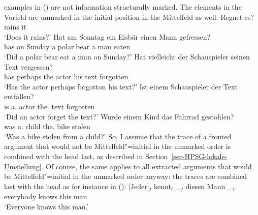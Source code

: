 examples in () are not information structurally marked. The elements in the Vorfeld are
unmarked in the initial position in the Mittelfeld as well:
\eal
\ex
\gll Regnet es?\\
     rains it\\
\glt `Does it rains?'
\ex 
\gll Hat am Sonntag ein Eisbär einen Mann gefressen?\\
     has on Sunday  a   polar.bear a man eaten\\
\glt `Did a polar bear eat a man on Sunday?'
\ex 
\gll Hat vielleicht der Schauspieler seinen Text vergessen?\\
     has perhaps    the actor his text forgotten\\
\glt `Has the actor perhaps forgotton his text?'
\ex 
\gll Ist einem Schauspieler der Text entfallen?\\
     is  a.\dat{} actor     the.\nom{} text forgotten\\
\glt `Did an actor forget the text?'
\ex
\gll Wurde einem Kind das Fahrrad gestohlen?\\
     was a.\dat{} child the.\nom{} bike stolen\\
\glt `Was a bike stolen from a child?'
\zl
So, I assume that the trace of a fronted argument that would not be Mittelfeld"=initial in the unmarked order is combined with
the head last, as described in Section~\ref{sec-HPSG-lokale-Umstellung}. Of course, the same applies
to all extracted arguments that would be Mittelfeld"=initial in the unmarked order anyway: the
traces are combined last with the head as for instance in ():
\ea
\label{Beispiel-Diesen-Mann-kent-jeder-HPSG}
\gll {}[Jeder]$_j$ kennt$_i$ \_$_j$ diesen Mann \_$_i$.\\
	 {}\spacebr{}everybody knows {} this man\\
\glt `Everyone knows this man.'
\z

